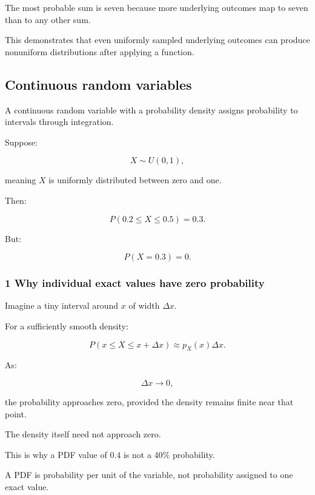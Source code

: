 The most probable sum is seven because more underlying outcomes map to seven than to any other sum.

This demonstrates that even uniformly sampled underlying outcomes can produce nonuniform distributions after applying a function.

\subsection{Continuous random variables}\label{02-foundations-ii-ch023-continuous-random-variables}

\hypertarget{02-foundations-ii-ch023-continuous-random-variables}{}

A continuous random variable with a probability density assigns probability to intervals through integration.

Suppose:

\[
 X\sim U(0,1),
\]

meaning \(X\) is uniformly distributed between zero and one.

Then:

\[
 P(0.2\le X\le0.5)=0.3.
\]

But:

\[
 P(X=0.3)=0.
\]

\subsubsection{1 Why individual exact values have zero probability}\label{02-foundations-ii-ch023-why-individual-exact-values-have-zero-probability}

\hypertarget{02-foundations-ii-ch023-why-individual-exact-values-have-zero-probability}{}

Imagine a tiny interval around \(x\) of width \(\Delta x\).

For a sufficiently smooth density:

\[
 P(x\le X\le x+\Delta x) \approx p_X(x)\Delta x.
\]

As:

\[
 \Delta x\to0,
\]

the probability approaches zero, provided the density remains finite near that point.

The density itself need not approach zero.

This is why a PDF value of \(0.4\) is not a 40\% probability.

A PDF is probability per unit of the variable, not probability assigned to one exact value.


